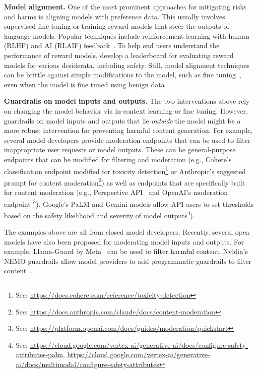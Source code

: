 \textbf{Model alignment.} One of the most prominent approaches for mitigating risks and harms is aligning models with preference data. This usually involves supervised fine tuning or training reward models that steer the outputs of language models. Popular techniques include reinforcement learning with human (RLHF) and AI (RLAIF) feedback~\citep{bai-constitutional-2022, ouyang2022training}. To help end users understand the performance of reward models, \citet{lambert2024rewardbench} develop a leaderboard for evaluating reward models for various desiderata, including safety. Still, model alignment techniques can be brittle against simple modifications to the model, such as fine tuning~\citep{qi2023fine}, even when the model is fine tuned using benign data~\citep{he2024s}.


\textbf{Guardrails on model inputs and outputs.} The two interventions above rely on changing the model behavior via in-context learning or fine tuning. However, guardrails on model inputs and outputs that lie \textit{outside} the model might be a more robust intervention for preventing harmful content generation. For example, several model developers provide moderation endpoints that can be used to filter inappropriate user requests or model outputs. These can be general-purpose endpoints that can be modified for filtering and moderation (e.g., Cohere's classification endpoint modified for toxicity detection\footnote{See: \url{https://docs.cohere.com/reference/toxicity-detection}} or Anthropic's suggested prompt for content moderation\footnote{See: \url{https://docs.anthropic.com/claude/docs/content-moderation}}) as well as endpoints that are specifically built for content moderation (e.g., Perspective API~\citep{lees2022new} and OpenAI's moderation endpoint \footnote{See: \url{https://platform.openai.com/docs/guides/moderation/quickstart}}). Google's PaLM and Gemini models allow API users to set thresholds based on the safety likelihood and severity of model outputs\footnote{See: \url{https://cloud.google.com/vertex-ai/generative-ai/docs/configure-safety-attributes-palm}, \url{https://cloud.google.com/vertex-ai/generative-ai/docs/multimodal/configure-safety-attributes}}).

The examples above are all from closed model developers. Recently, several open models have also been proposed for moderating model inputs and outputs. For example, Llama-Guard by Meta~\citep{inan2023llama} can be used to filter harmful content. Nvidia's NEMO guardrails allow model providers to add programmatic guardrails to filter content~\citep{rebedea2023nemo}.


